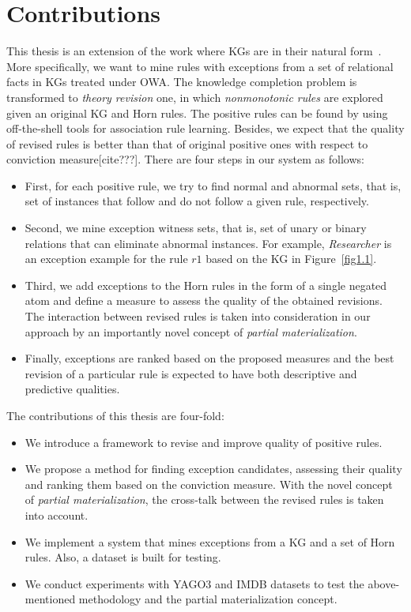 \section{Contributions}

This thesis is an extension of the work where KGs are in their natural form~\cite{ref12}. More specifically, we want to mine rules with exceptions from a set of relational facts in KGs treated under OWA. The knowledge completion problem is transformed to \textit{theory revision} one, in which \textit{nonmonotonic rules} are explored given an original KG and Horn rules. The positive rules can be found by using off-the-shell tools for association rule learning. Besides, we expect that the quality of revised rules is better than that of original positive ones with respect to conviction measure[cite???]. There are four steps in our system as follows:

\begin{itemize}
\item First, for each positive rule, we try to find normal and abnormal sets, that is, set of instances that follow and do not follow a given rule, respectively.
\item Second, we mine exception witness sets, that is, set of unary or binary relations that can eliminate abnormal instances. For example, \textit{Researcher} is an exception example for the rule $r1$ based on the KG in Figure~\ref{fig1.1}.
\item Third, we add exceptions to the Horn rules in the form of a single negated atom and define a measure to assess the quality of the obtained revisions. The interaction between revised rules is taken into consideration in our approach by an importantly novel concept of \textit{partial materialization}.
\item Finally, exceptions are ranked based on the proposed measures and the best revision of a particular rule is expected to have both descriptive and predictive qualities.
\end{itemize}

The contributions of this thesis are four-fold:

\begin{itemize}
\item We introduce a framework to revise and improve quality of positive rules.
\item We propose a method for finding exception candidates, assessing their quality and ranking them based on the conviction measure. With the novel concept of \textit{partial materialization}, the cross-talk between the revised rules is taken into account.
\item We implement a system that mines exceptions from a KG and a set of Horn rules. Also, a dataset is built for testing.
\item We conduct experiments with YAGO3 and IMDB datasets to test the above-mentioned methodology and the partial materialization concept.
\end{itemize}

